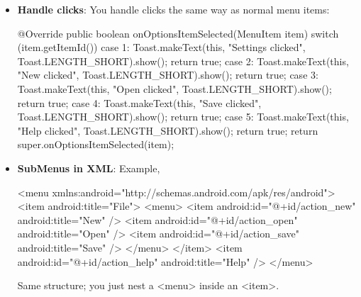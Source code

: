 \documentclass{report}
\begin{document}
\begin{itemize}
\begin{javacode}
{                    return true;
                }
            \end{javacode}
        \item \textbf{Handle clicks}: You handle clicks the same way as normal menu items:
            \bigbreak \noindent 
            \begin{javacode}
                @Override
                public boolean onOptionsItemSelected(MenuItem item) {
                    switch (item.getItemId()) {
                        case 1:
                            Toast.makeText(this, "Settings clicked", Toast.LENGTH_SHORT).show();
                            return true;
                        case 2:
                            Toast.makeText(this, "New clicked", Toast.LENGTH_SHORT).show();
                            return true;
                        case 3:
                            Toast.makeText(this, "Open clicked", Toast.LENGTH_SHORT).show();
                            return true;
                        case 4:
                            Toast.makeText(this, "Save clicked", Toast.LENGTH_SHORT).show();
                            return true;
                        case 5:
                            Toast.makeText(this, "Help clicked", Toast.LENGTH_SHORT).show();
                            return true;
                    }
                    return super.onOptionsItemSelected(item);
                }
            \end{javacode}
        \item \textbf{SubMenus in XML}: Example,
            \bigbreak \noindent 
            \begin{xmlcode}
                <menu xmlns:android="http://schemas.android.com/apk/res/android">
                    <item android:title="File">
                        <menu>
                            <item android:id="@+id/action_new" android:title="New" />
                            <item android:id="@+id/action_open" android:title="Open" />
                            <item android:id="@+id/action_save" android:title="Save" />
                        </menu>
                    </item>
                    <item android:id="@+id/action_help" android:title="Help" />
                </menu>
            \end{xmlcode}
            \bigbreak \noindent 
            Same structure; you just nest a <menu> inside an <item>.
    \end{itemize}

    \pagebreak 
\end{document}
